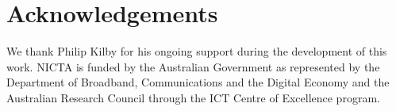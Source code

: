 \section{Acknowledgements}
We thank Philip Kilby for his ongoing support during the development of this work.
NICTA is funded by the Australian Government as represented by the Department of 
Broadband, Communications and the Digital Economy and the Australian Research 
Council through the ICT Centre of Excellence program.

